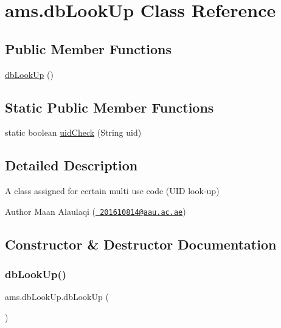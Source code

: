 \hypertarget{classams_1_1db_look_up}{}\section{ams.\+db\+Look\+Up Class Reference}
\label{classams_1_1db_look_up}
\subsection*{Public Member Functions}
\begin{DoxyCompactItemize}
\item 
\mbox{\hyperlink{classams_1_1db_look_up_ad6c18e9b1273bb02213060aa47289fed}{db\+Look\+Up}} ()
\end{DoxyCompactItemize}
\subsection*{Static Public Member Functions}
\begin{DoxyCompactItemize}
\item 
static boolean \mbox{\hyperlink{classams_1_1db_look_up_ac09044c1aea786643ccaf67188c61ca3}{uid\+Check}} (String uid)
\end{DoxyCompactItemize}


\subsection{Detailed Description}
A class assigned for certain multi use code (U\+ID look-\/up)

\begin{DoxyAuthor}{Author}
Maan Alaulaqi (\href{mailto:201610814@aau.ac.ae}{\texttt{ 201610814@aau.\+ac.\+ae}}) 
\end{DoxyAuthor}


\subsection{Constructor \& Destructor Documentation}
\mbox{\label{classams_1_1db_look_up_ad6c18e9b1273bb02213060aa47289fed}} 
\subsubsection{\texorpdfstring{dbLookUp()}{dbLookUp()}}
{\footnotesize\ttfamily ams.\+db\+Look\+Up.\+db\+Look\+Up (\begin{DoxyParamCaption}{ }\end{DoxyParamCaption})}



